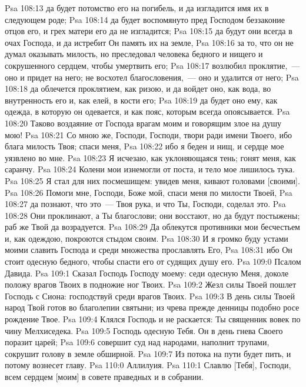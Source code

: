 \vs Psa 108:13 да будет потомство его на погибель, и да изгладится имя их в следующем роде;
\vs Psa 108:14 да будет воспомянуто пред Господом беззаконие отцов его, и грех матери его да не изгладится;
\vs Psa 108:15 да будут они всегда в очах Господа, и да истребит Он память их на земле,
\vs Psa 108:16 за то, что он не думал оказывать милость, но преследовал человека бедного и нищего и сокрушенного сердцем, чтобы умертвить его;
\vs Psa 108:17 возлюбил проклятие,~--- оно и придет на него; не восхотел благословения,~--- оно и удалится от него;
\vs Psa 108:18 да облечется проклятием, как ризою, и да войдет оно, как вода, во внутренность его и, как елей, в кости его;
\vs Psa 108:19 да будет оно ему, как одежда, в которую он одевается, и как пояс, которым всегда опоясывается.
\vs Psa 108:20 Таково воздаяние от Господа врагам моим и говорящим злое на душу мою!
\vs Psa 108:21 Со мною же, Господи, Господи, твори ради имени Твоего, ибо блага милость Твоя; спаси меня,
\vs Psa 108:22 ибо я беден и нищ, и сердце мое уязвлено во мне.
\vs Psa 108:23 Я исчезаю, как уклоняющаяся тень; гонят меня, как саранчу.
\vs Psa 108:24 Колени мои изнемогли от поста, и тело мое лишилось тука.
\vs Psa 108:25 Я стал для них посмешищем: увидев меня, кивают головами [своими].
\vs Psa 108:26 Помоги мне, Господи, Боже мой, спаси меня по милости Твоей,
\vs Psa 108:27 да познают, что это~--- Твоя рука, и что Ты, Господи, соделал это.
\vs Psa 108:28 Они проклинают, а Ты благослови; они восстают, но да будут постыжены; раб же Твой да возрадуется.
\vs Psa 108:29 Да облекутся противники мои бесчестьем и, как одеждою, покроются стыдом своим.
\vs Psa 108:30 И я громко буду устами моими славить Господа и среди множества прославлять Его,
\vs Psa 108:31 ибо Он стоит одесную бедного, чтобы спасти его от судящих душу его.
\vs Psa 109:0 Псалом Давида.
\rsbpar\vs Psa 109:1 Сказал Господь Господу моему: седи одесную Меня, доколе положу врагов Твоих в подножие ног Твоих.
\vs Psa 109:2 Жезл силы Твоей пошлет Господь с Сиона: господствуй среди врагов Твоих.
\vs Psa 109:3 В день силы Твоей народ Твой готов во благолепии святыни; из чрева прежде денницы подобно росе рождение Твое.
\vs Psa 109:4 Клялся Господь и не раскается: Ты священник вовек по чину Мелхиседека.
\vs Psa 109:5 Господь одесную Тебя. Он в день гнева Своего поразит царей;
\vs Psa 109:6 совершит суд над народами, наполнит  трупами, сокрушит голову в земле обширной.
\vs Psa 109:7 Из потока на пути будет пить, и потому вознесет главу.
\vs Psa 110:0 Аллилуия.
\rsbpar\vs Psa 110:1 Славлю [Тебя], Господи, всем сердцем [моим] в совете праведных и в собрании.
